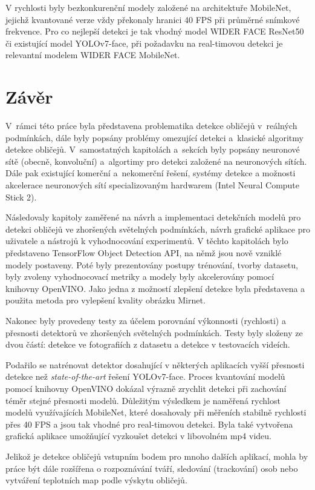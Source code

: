 V rychlosti byly bezkonkurenční modely založené na architektuře MobileNet, jejichž kvantované verze vždy překonaly hranici 40 FPS při průměrné snímkové frekvence. Pro co nejlepší detekci je tak vhodný model WIDER FACE ResNet50 či existující model YOLOv7-face, při požadavku na real-timovou detekci je relevantní modelem WIDER FACE MobileNet.



\chapter{Závěr}
\label{kapitola:zaver}

V~rámci této práce byla představena problematika detekce obličejů v~reálných podmínkách, dále byly popsány problémy omezující detekci a~klasické algoritmy detekce obličejů. V~samostatných kapitolách a~sekcích byly popsány neuronové sítě (obecně, konvoluční) a~algortimy pro detekci založené na neuronových sítích. Dále pak existující komerční a~nekomerční řešení, systémy detekce a možnosti akcelerace neuronových sítí specializovaným hardwarem (Intel Neural Compute Stick 2).

Následovaly kapitoly zaměřené na návrh a implementaci detekčních modelů pro detekci obličejů ve zhoršených světelných podmínkách, návrh grafické aplikace pro uživatele a nástrojů k vyhodnocování experimentů. V těchto kapitolách bylo představeno TensorFlow Object Detection API, na němž jsou nově vzniklé modely postaveny. Poté byly prezentovány postupy trénování, tvorby datasetu, byly zvoleny vyhodnocovací metriky a modely byly akcelerovány pomocí knihovny OpenVINO. Jako jedna z možností zlepšení detekce byla představena a použita metoda pro vylepšení kvality obrázku Mirnet.

Nakonec byly provedeny testy za účelem porovnání výkonnosti (rychlosti) a přesnosti detektorů ve zhoršených světelných podmínkách. Testy byly složeny ze dvou částí: detekce ve fotografiích z datasetu a detekce v testovacích videích.

Podařilo se natrénovat detektor dosahující v některých aplikacích vyšší přesnosti detekce než \emph{state-of-the-art} řešení YOLOv7-face. Proces kvantování modelů pomocí knihovny OpenVINO dokázal výrazně zrychlit detekci při zachování téměr stejné přesnosti modelů.
Důležitým výsledkem je naměřená rychlost modelů využívajících MobileNet, které dosahovaly při měřeních stabilně rychlosti přes 40 FPS a jsou tak vhodné pro real-timovou detekci.
Byla také vytvořena grafická aplikace umožňující vyzkoušet detekci v libovolném mp4 videu. 

Jelikož je detekce obličejů vstupním bodem pro mnoho dalších aplikací, mohla by práce být dále rozšířena o rozpoznávání tváří, sledování (trackování) osob nebo vytváření teplotních map podle výskytu obličejů.